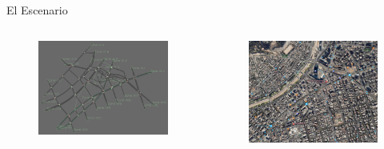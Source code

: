 \documentclass[aspectratio=169]{beamer}
\begin{document}
\begin{frame}{El Escenario}
\begin{columns}
    \begin{column}{.5\linewidth}
        \begin{figure}[p]
            \centering
            \includegraphics[width=\linewidth]{figuras/costanera.png}
        \end{figure}
    \end{column}
    \begin{column}{.5\linewidth}
        \begin{figure}[p]
            \centering
            \includegraphics[width=\linewidth]{figuras/costanera_maps.png}
        \end{figure}
    \end{column}
\end{columns}
\end{frame}
\end{document}
